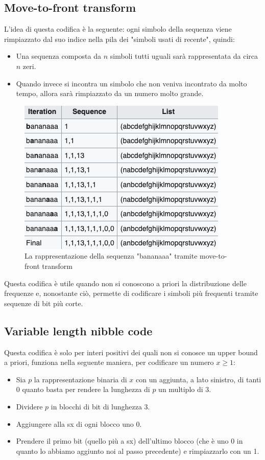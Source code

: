 \documentclass[12pt,a4paper]{article}
\begin{document}
\subsection{Move-to-front transform}
L'idea di questa codifica è la seguente: ogni simbolo della sequenza viene rimpiazzato dal suo indice nella pila dei "simboli usati di recente", quindi:
\begin{itemize}
\item Una sequenza composta da $n$ simboli tutti uguali sarà rappresentata  da circa $n$ zeri.
\item Quando invece si incontra un simbolo che non veniva incontrato da molto tempo, allora sarà rimpiazzato da un numero molto grande.
\end{itemize}
\begin{figure}[h]
	\centering
	\includegraphics[width=0.5\linewidth]{img/move_front}
	\caption{La rappresentazione della sequenza "bananaaa" tramite move-to-front transform}
	\label{fig:move_front}
\end{figure}
Questa codifica è utile quando non si conoscono a priori la distribuzione delle frequenze e, nonostante ciò, permette di codificare i simboli più frequenti tramite sequenze di bit più corte.

\subsection{Variable length nibble code}
Questa codifica è solo per interi positivi dei quali non si conosce un upper bound a priori, funziona nella seguente maniera, per codificare un numero $x \geq 1$:
\begin{itemize}
\item Sia $p$ la rappresentazione binaria di $x$ con un aggiunta, a lato sinistro, di tanti 0 quanto basta per rendere la lunghezza di $p$ un multiplo di 3.
\item Dividere $p$ in blocchi di bit di lunghezza 3.
\item Aggiungere alla sx di ogni blocco uno 0.
\item Prendere il primo bit (quello più a sx) dell'ultimo blocco (che è uno 0 in quanto lo abbiamo aggiunto noi al passo precedente) e rimpiazzarlo con un 1.
\end{itemize}
\end{document}
